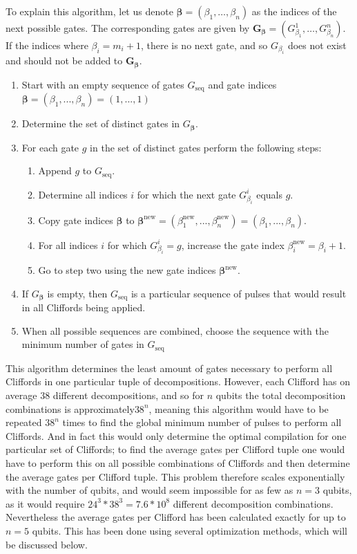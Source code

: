       To explain this algorithm, let us denote $\bm{\beta}=\left(\beta_1, \dots, \beta_n\right)$ as the indices of the next possible gates. The corresponding gates are given by $\bm{G_\bm{\beta}}=\left( G_{\beta_1}^1, \dots, G_{\beta_n}^n \right)$. If the indices where $\beta_i=m_i + 1$, there is no next gate, and so $G_{\beta_i}$ does not exist and should not be added to $\bm{G_\bm{\beta}}$.

      \begin{enumerate}
        \item Start with an empty sequence of gates $G_\text{seq}$ and gate indices $\bm{\beta} = \left(\beta_1, ..., \beta_n\right) = \left(1, ..., 1\right)$
        \item Determine the set of distinct gates in $G_{\bm{\beta}}$.
        \item For each gate $g$ in the set of distinct gates perform the following steps:
        \begin{enumerate}
          \item Append $g$ to $G_\text{seq}$.
          \item Determine all indices $i$ for which the next gate $G_{\beta_i}^i$ equals $g$.
          \item Copy gate indices $\bm{\beta}$ to $\bm{\beta}^\text{new}=\left(\beta_1^\text{new}, ..., \beta_n^\text{new}\right)=\left(\beta_1, ..., \beta_n\right)$.
          \item For all indices $i$ for which $G_{\beta_i}^i=g$, increase the gate index $\beta_i^\text{new} = \beta_i+1$.
          \item Go to step two using the new gate indices $\bm{\beta}^\text{new}$.
        \end{enumerate}
        \item If $G_{\bm{\beta}}$ is empty, then $G_\text{seq}$ is a particular sequence of pulses that would result in all Cliffords being applied.
        \item When all possible sequences are combined, choose the sequence with the minimum number of gates in $G_\text{seq}$
      \end{enumerate}

      This algorithm determines the least amount of gates necessary to perform all Cliffords in one particular tuple of decompositions. However, each Clifford has on average $38$ different decompositions, and so for $n$ qubits the total decomposition combinations is approximately$38^n$, meaning this algorithm would have to be repeated $38^n$ times to find the global minimum number of pulses to perform all Cliffords. And in fact this would only determine the optimal compilation for one particular set of Cliffords; to find the average gates per Clifford tuple one would have to perform this on all possible combinations of Cliffords and then determine the average gates per Clifford tuple. This problem therefore scales exponentially with the number of qubits, and would seem impossible for as few as $n=3$ qubits, as it would require $24^3*38^3=7.6*10^8$ different decomposition combinations. Nevertheless the average gates per Clifford has been calculated exactly for up to $n=5$ qubits. This has been done using several optimization methods, which will be discussed below.

